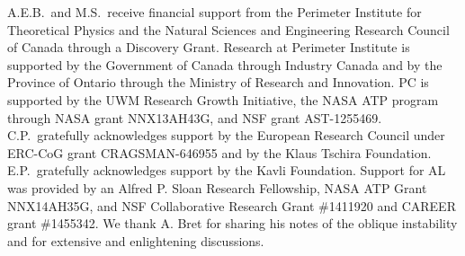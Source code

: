 \documentclass[usenatbib,iop,apj,numberedappendix]{aeb_emulateapj_2015}
\newcommand{\epm}{\ensuremath{e^{\pm}}}
\begin{document}

\acknowledgements
A.E.B.~and M.S.~receive financial support from the Perimeter
Institute for Theoretical Physics and the Natural Sciences and
Engineering Research Council of Canada through a Discovery Grant.
Research at Perimeter Institute is supported by the Government of
Canada through Industry Canada and by the Province of Ontario through
the Ministry of Research and Innovation.
PC is supported by the UWM Research Growth Initiative, the NASA ATP
program through NASA grant NNX13AH43G, and NSF grant AST-1255469.
C.P.~gratefully acknowledges support by the European Research Council under ERC-CoG grant CRAGSMAN-646955 and by the Klaus Tschira Foundation.
E.P.~gratefully acknowledges support by the Kavli Foundation. Support for AL was provided by an Alfred P. Sloan Research Fellowship, NASA ATP Grant NNX14AH35G, and NSF Collaborative Research Grant \#1411920 and CAREER grant \#1455342.
We thank A. Bret for sharing his notes of the oblique instability and for extensive and enlightening discussions. 
\end{document}
